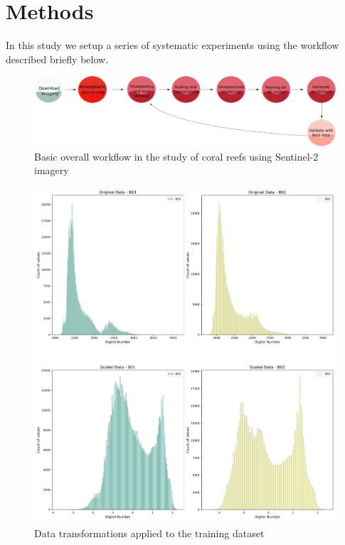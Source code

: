 \documentclass[journal,article,submit,pdftex,moreauthors]{Definitions/mdpi}
\begin{document}
\section{Methods}
In this study we setup a series of systematic experiments using the workflow described briefly below. 

\begin{figure}
	\includegraphics[width=\linewidth]{Images/Flow_Chart.png}
	\caption{Basic overall workflow in the study of coral reefs using Sentinel-2 imagery}
	\label{fig:workflow}
\end{figure}

\begin{figure}
	\includegraphics[width=\linewidth]{Images/Scaling_Training_Data.png}
	\caption{Data transformations applied to the training dataset}
	\label{fig:Scaling}
\end{figure}
\end{document}
